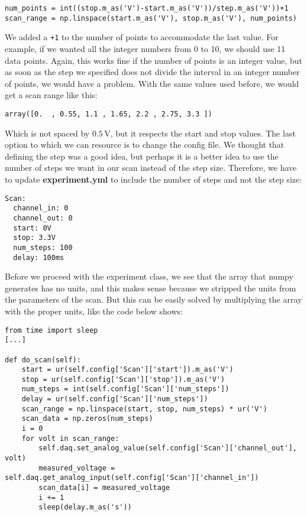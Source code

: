 \begin{verbatim}
num_points = int((stop.m_as('V')-start.m_as('V'))/step.m_as('V'))+1
scan_range = np.linspace(start.m_as('V'), stop.m_as('V'), num_points)
\end{verbatim}

We added a \texttt{+1} to the number of points to accommodate the last value. For example, if we wanted all the integer numbers from 0 to 10, we should use 11 data points. Again, this works fine if the number of points is an integer value, but as soon as the step we specified does not divide the interval in an integer number of points, we would have a problem. With the same values used before, we would get a scan range like this:

\begin{verbatim}
array([0.  , 0.55, 1.1 , 1.65, 2.2 , 2.75, 3.3 ])
\end{verbatim}

Which is not spaced by $0.5\,\textrm{V}$, but it respects the start and stop values. The last option to which we can resource is to change the config file. We thought that defining the step was a good idea, but perhaps it is a better idea to use the number of steps we want in our scan instead of the step size. Therefore, we have to update \textbf{experiment.yml} to include the number of steps and not the step size:

\begin{verbatim}
Scan:
  channel_in: 0
  channel_out: 0
  start: 0V
  stop: 3.3V
  num_steps: 100
  delay: 100ms
\end{verbatim}

Before we proceed with the experiment class, we see that the array that numpy generates has no units, and this makes sense because we stripped the units from the parameters of the scan. But this can be easily solved by multiplying the array with the proper units, like the code below shows:

\begin{verbatim}
from time import sleep
[...]

def do_scan(self):
    start = ur(self.config['Scan']['start']).m_as('V')
    stop = ur(self.config['Scan']['stop']).m_as('V')
    num_steps = int(self.config['Scan']['num_steps'])
    delay = ur(self.config['Scan']['num_steps'])
    scan_range = np.linspace(start, stop, num_steps) * ur('V')
    scan_data = np.zeros(num_steps)
    i = 0
    for volt in scan_range:
        self.daq.set_analog_value(self.config['Scan']['channel_out'], volt)
        measured_voltage = self.daq.get_analog_input(self.config['Scan']['channel_in'])
        scan_data[i] = measured_voltage
        i += 1
        sleep(delay.m_as('s'))
\end{verbatim}

